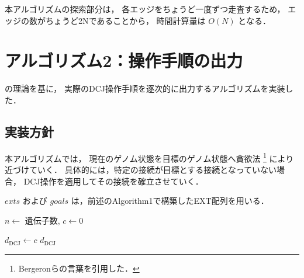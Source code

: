 \documentclass[paper=a4,fontsize=11pt,report,oneside]{jlreq}
\begin{document}
本アルゴリズムの探索部分は，
各エッジをちょうど一度ずつ走査するため，
エッジの数がちょうど2Nであることから，
時間計算量は $O(N)$ となる．



\chapter{アルゴリズム2：操作手順の出力}

\cite{bergeron2006} の理論を基に，
実際のDCJ操作手順を逐次的に出力するアルゴリズムを実装した．

\section{実装方針}
本アルゴリズムでは，
現在のゲノム状態を目標のゲノム状態へ貪欲法
\footnote{
    Bergeronら\cite{bergeron2006}の言葉を引用した．
}
により近づけていく．
具体的には，特定の接続が目標とする接続となっていない場合，
DCJ操作を適用してその接続を確立させていく．


$exts$ および $goals$ は，前述のAlgorithm1で構築したEXT配列を用いる．
\begin{algorithm}[H]
    \caption{DCJ操作によるゲノムソート手順の生成}
    \label{alg:proceed}



    $n \leftarrow$ 遺伝子数, $c \leftarrow 0$\;



    $d_{\mathrm{DCJ}} \leftarrow c$\;
    \Return $d_{\mathrm{DCJ}}$\;
\end{algorithm}
\end{document}
